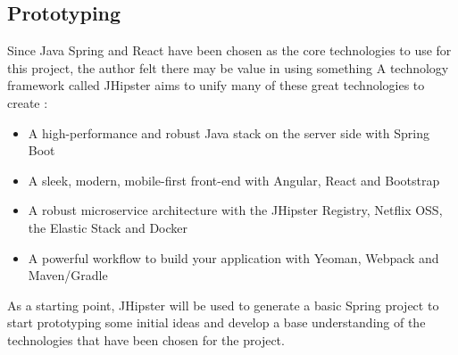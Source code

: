 \subsection{Prototyping}
Since Java Spring and React have been chosen as the core technologies to use for this project, the author felt there may be value in using something
A technology framework called JHipster aims to unify many of these great technologies to create \cite{jhipster2015whatisit}: 
\begin{itemize}
    \tightlist
    \item A high-performance and robust Java stack on the server side with Spring Boot
    \item A sleek, modern, mobile-first front-end with Angular, React and Bootstrap
    \item A robust microservice architecture with the JHipster Registry, Netflix OSS, the Elastic Stack and Docker
    \item A powerful workflow to build your application with Yeoman, Webpack and Maven/Gradle
\end{itemize}

As a starting point, JHipster will be used to generate a basic Spring project to start prototyping some initial ideas and develop a
base understanding of the technologies that have been chosen for the project.


\clearpage